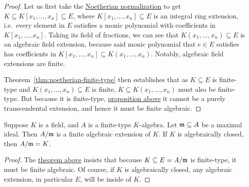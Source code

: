 \begin{proof}
    Let us first take the \hyperref[thm:noetherian-normalization]{Noetherian normalization}
    to get \(K \subseteq K[x_1,\hdots,x_n] \subseteq E\),
    where \(K[x_1,\hdots,x_n] \subseteq E\) is an integral ring extension,
    i.e.\ every element in \(E\) satisfies a monic polynomial with coefficients in \(K[x_1,\hdots,x_n]\).
    Taking its field of fractions,
    we can see that \(K(x_1,\hdots,x_n) \subseteq E\) is an algebraic field extension,
    because said monic polynomial that \(e \in E\) satisfies
    has coefficients in \(K[x_1,\hdots,x_n] \subseteq K(x_1,\hdots,x_n)\).
    Notably, algebraic field extensions are finite.

    Theorem~\ref{thm:noetherian-finite-type} then establishes that
    as \(K \subseteq E\) is finite-type and \(K(x_1,\hdots,x_n) \subseteq E\) is finite,
    \(K \subseteq K(x_1,\hdots,x_n)\) must also be finite-type.
    But because it is finite-type,
    \hyperref[prop:finite-type-algebraic]{proposition above}
    it cannot be a purely transcendental extension,
    and hence it must be finite algebraic.
\end{proof}
\begin{corollary}\label{cor:weak-nullstellensatz}
    Suppose \(K\) is a field, and \(A\) is a finite-type \(K\)-algebra.
    Let \(\mathfrak{m} \subseteq A\) be a maximal ideal.
    Then \(A/\mathfrak{m}\) is a finite algebraic extension of \(K\).
    If \(K\) is algebraically closed, then \(A/\mathfrak{m} = K\).
\end{corollary}
\begin{proof}
    The \hyperref[thm:finite-type-algebraic]{theorem above}
    insists that because \(K \subseteq E = A/\mathfrak{m}\) is finite-type,
    it must be finite algebraic.
    Of course, if \(K\) is algebraically closed,
    any algebraic extension, in particular \(E\),
    will be inside of \(K\).
\end{proof}

